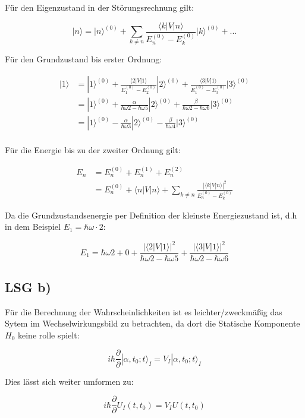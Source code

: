 Für den Eigenzustand in der Störungsrechnung gilt:

\[ |n\rangle = |n\rangle ^{(0)}+\sum_{k\neq n} \frac{\langle k|V|n\rangle }{E_n^{(0)}- E_k^{(0)}}|k\rangle ^{(0)} + ... \]

Für den Grundzustand bis erster Ordnung:

\begin{align} 
|1\rangle &= |1\rangle ^{(0)}+\frac{\langle 2|V|1\rangle }{E_1^{(0)}- E_2^{(0)}}|2\rangle ^{(0)} +  \frac{\langle 3|V|1\rangle }{E_1^{(0)}- E_3^{(0)}}|3\rangle ^{(0)} \\
&= |1\rangle ^{(0)}+\frac{\alpha }{\hbar\omega 2- \hbar\omega 5}|2\rangle ^{(0)} +  \frac{\beta }{\hbar\omega 2- \hbar\omega 6}|3\rangle ^{(0)} \\
&= |1\rangle ^{(0)}-\frac{\alpha }{\hbar\omega 3}|2\rangle ^{(0)} -  \frac{\beta }{\hbar\omega 4}|3\rangle ^{(0)} \\
\end{align}

Für die Energie bis zu der zweiter Ordnung gilt:

\begin{align}
E_n &= E_n^{(0)}+ E_n^{(1)}+E_n^{(2)} \\
&=E_n^{(0)} + \langle n|V|n\rangle + \sum_{k\neq n}\frac{|\langle
  k|V|n\rangle|^2}{E_n^{(0)}- E_k^{(0)}}
\end{align}

Da die Grundzustandsenergie per Definition der kleinste Energiezustand ist, d.h in dem Beispiel \(E_1=\hbar\omega\cdot 2\):


\[E_1 = \hbar\omega 2 + 0 +  \frac{|\langle 2|V|1\rangle|^2}{\hbar\omega 2
  -\hbar\omega 5  } + \frac{|\langle 3|V|1\rangle|^2}{\hbar\omega 2
  -\hbar\omega 6  } \]



\subsection*{LSG b)}

Für die Berechnung der Wahrscheinlichkeiten ist es leichter/zweckmäßig das Sytem im Wechselwirkungsbild zu betrachten, da dort die Statische Komponente \(H_0\) keine rolle spielt:

\[i\hbar \frac{\partial}{\partial}|\alpha,t_0;t\rangle_I = V_I|\alpha,t_0;t\rangle_I\]

Dies lässt sich weiter umformen zu:

\[ i\hbar \frac{\partial}{\partial} U_I(t,t_0) = V_I U(t,t_0)  \]

